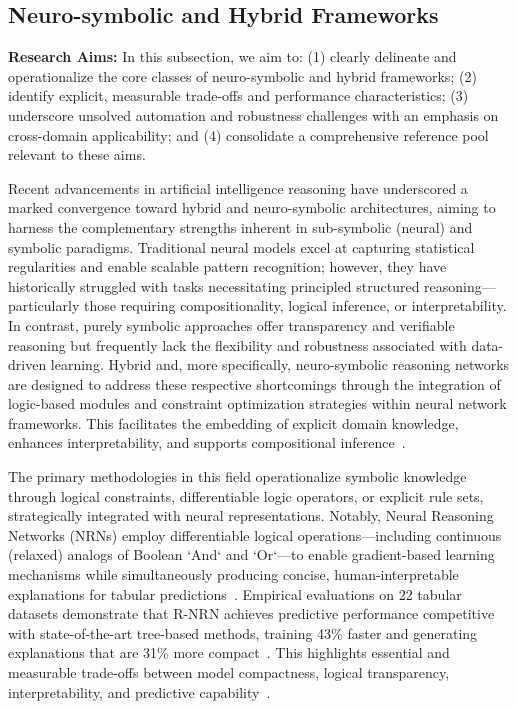 \documentclass[sigconf]{acmart}
\begin{document}
\subsection{Neuro-symbolic and Hybrid Frameworks}

\textbf{Research Aims:} In this subsection, we aim to: (1) clearly delineate and operationalize the core classes of neuro-symbolic and hybrid frameworks; (2) identify explicit, measurable trade-offs and performance characteristics; (3) underscore unsolved automation and robustness challenges with an emphasis on cross-domain applicability; and (4) consolidate a comprehensive reference pool relevant to these aims.

Recent advancements in artificial intelligence reasoning have underscored a marked convergence toward hybrid and neuro-symbolic architectures, aiming to harness the complementary strengths inherent in sub-symbolic (neural) and symbolic paradigms. Traditional neural models excel at capturing statistical regularities and enable scalable pattern recognition; however, they have historically struggled with tasks necessitating principled structured reasoning—particularly those requiring compositionality, logical inference, or interpretability. In contrast, purely symbolic approaches offer transparency and verifiable reasoning but frequently lack the flexibility and robustness associated with data-driven learning. Hybrid and, more specifically, neuro-symbolic reasoning networks are designed to address these respective shortcomings through the integration of logic-based modules and constraint optimization strategies within neural network frameworks. This facilitates the embedding of explicit domain knowledge, enhances interpretability, and supports compositional inference~\cite{ref93,ref1,ref10,ref11,ref22,ref42,ref45,ref49,ref54,ref56,ref68,ref86}.

The primary methodologies in this field operationalize symbolic knowledge through logical constraints, differentiable logic operators, or explicit rule sets, strategically integrated with neural representations. Notably, Neural Reasoning Networks (NRNs) employ differentiable logical operations—including continuous (relaxed) analogs of Boolean `And` and `Or`—to enable gradient-based learning mechanisms while simultaneously producing concise, human-interpretable explanations for tabular predictions~\cite{ref93}. Empirical evaluations on 22 tabular datasets demonstrate that R-NRN achieves predictive performance competitive with state-of-the-art tree-based methods, training 43\% faster and generating explanations that are 31\% more compact~\cite{ref93}. This highlights essential and measurable trade-offs between model compactness, logical transparency, interpretability, and predictive capability~\cite{ref93,ref49}.
\end{document}
